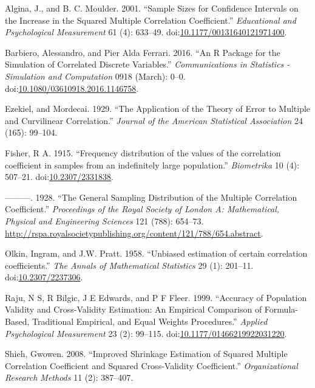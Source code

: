 \documentclass[]{article}
\begin{document}
\hypertarget{ref-Algina2001}{}
Algina, J., and B. C. Moulder. 2001. ``Sample Sizes for Confidence
Intervals on the Increase in the Squared Multiple Correlation
Coefficient.'' \emph{Educational and Psychological Measurement} 61 (4):
633--49.
doi:\href{https://doi.org/10.1177/00131640121971400}{10.1177/00131640121971400}.

\hypertarget{ref-Barbiero2016}{}
Barbiero, Alessandro, and Pier Alda Ferrari. 2016. ``An R Package for
the Simulation of Correlated Discrete Variables.'' \emph{Communications
in Statistics - Simulation and Computation} 0918 (March): 0--0.
doi:\href{https://doi.org/10.1080/03610918.2016.1146758}{10.1080/03610918.2016.1146758}.

\hypertarget{ref-Ezekiel1929}{}
Ezekiel, and Mordecai. 1929. ``The Application of the Theory of Error to
Multiple and Curvilinear Correlation.'' \emph{Journal of the American
Statistical Association} 24 (165): 99--104.

\hypertarget{ref-Fisher1915}{}
Fisher, R A. 1915. ``Frequency distribution of the values of the
correlation coefficient in samples from an indefinitely large
population.'' \emph{Biometrika} 10 (4): 507--21.
doi:\href{https://doi.org/10.2307/2331838}{10.2307/2331838}.

\hypertarget{ref-Fisher1928}{}
---------. 1928. ``The General Sampling Distribution of the Multiple
Correlation Coefficient.'' \emph{Proceedings of the Royal Society of
London A: Mathematical, Physical and Engineering Sciences} 121 (788):
654--73.
\url{http://rspa.royalsocietypublishing.org/content/121/788/654.abstract}.

\hypertarget{ref-Olkin1958}{}
Olkin, Ingram, and J.W. Pratt. 1958. ``Unbiased estimation of certain
correlation coefficients.'' \emph{The Annals of Mathematical Statistics}
29 (1): 201--11.
doi:\href{https://doi.org/10.2307/2237306}{10.2307/2237306}.

\hypertarget{ref-Raju1999}{}
Raju, N S, R Bilgic, J E Edwards, and P F Fleer. 1999. ``Accuracy of
Population Validity and Cross-Validity Estimation: An Empirical
Comparison of Formula-Based, Traditional Empirical, and Equal Weights
Procedures.'' \emph{Applied Psychological Measurement} 23 (2): 99--115.
doi:\href{https://doi.org/10.1177/01466219922031220}{10.1177/01466219922031220}.

\hypertarget{ref-Shieh2008}{}
Shieh, Gwowen. 2008. ``Improved Shrinkage Estimation of Squared Multiple
Correlation Coefficient and Squared Cross-Validity Coefficient.''
\emph{Organizational Research Methods} 11 (2): 387--407.
\end{document}
